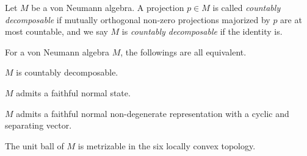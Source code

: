 \documentclass{../../../small}
\begin{document}
\begin{defn}
Let $M$ be a von Neumann algebra.
A projection $p\in M$ is called \emph{countably decomposable} if mutually orthogonal non-zero projections majorized by $p$ are at most countable, and we say $M$ is \emph{countably decomposable} if the identity is.
\end{defn}
\begin{prop}
For a von Neumann algebra $M$, the followings are all equivalent.
\begin{parts}
\item $M$ is countably decomposable.
\item $M$ admits a faithful normal state.
\item $M$ admits a faithful normal non-degenerate representation with a cyclic and separating vector.
\item The unit ball of $M$ is metrizable in the six locally convex topology.
\end{parts}
\end{prop}
\end{document}
